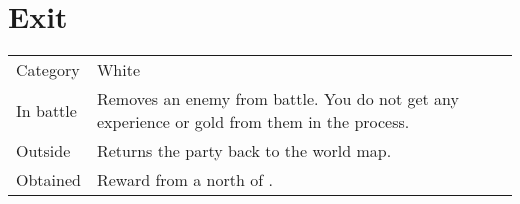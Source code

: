 \section{Exit}
\label{spell:exit}


\noindent\begin{tabularx}{\textwidth}[l]{lX}
	Category
	& White
\\
	In battle
	& Removes an enemy from battle. You do not get any experience or gold from them in the process.
\\
	Outside
	& Returns the party back to the world map.
\\
	Obtained
	& Reward from a \nameref{map:battlefield_10} north of \nameref{map:libra_temple}.
\end{tabularx}
